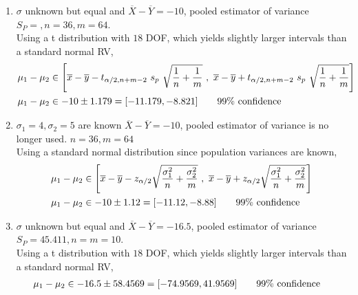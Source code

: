 \begin{enumerate}
	\item  $ \sigma $ unknown but equal and $ \overline{X} - \overline{Y} = -10 $, pooled estimator of variance $ S_P = , n = 36, m = 64$. \\
	Using a t distribution with $ 18 $ DOF, which yields slightly larger intervals than a standard normal RV,\\
	\begin{subequations}
		\begin{align}
			\mu_1 - \mu_2 &\in \left[ \overline{x} - \overline{y} - t_{\alpha / 2, n+m-2}\ s_p\ \sqrt{\frac{1}{n} + \frac{1}{m}}\ ,\ \overline{x} - \overline{y} + t_{\alpha / 2, n+m-2}\ s_p\ \sqrt{\frac{1}{n} + \frac{1}{m}} \right]  \nonumber \\
			\mu_1 - \mu_2 &\in -10 \pm 1.179 = [-11.179, -8.821] \qquad \text{99\% confidence}  
		\end{align}\\
	\end{subequations}
	
	\item  $ \sigma_1 = 4, \sigma_2 = 5 $ are known  $ \overline{X} - \overline{Y} = -10 $, pooled estimator of variance is no longer used. $n = 36, m = 64$ \\
	Using a standard normal distribution since population variances are known,\\
	\begin{subequations}
		\begin{align}
			\mu_1 - \mu_2 &\in \left[ \overline{x} - \overline{y} - z_{\alpha / 2} \sqrt{\frac{\sigma_1^2}{n} + \frac{\sigma_2^2}{m}}\ ,\ \overline{x} - \overline{y} + z_{\alpha / 2} \sqrt{\frac{\sigma_1^2}{n} + \frac{\sigma_2^2}{m}} \right]   \nonumber \\
			\mu_1 - \mu_2 &\in -10 \pm 1.12 = [-11.12, -8.88] \qquad \text{99\% confidence}  
		\end{align}\\
	\end{subequations}


	\item  $ \sigma $ unknown but equal and $ \overline{X} - \overline{Y} = -16.5 $, pooled estimator of variance $ S_P = 45.411, n = m = 10$. \\
	
	Using a t distribution with $ 18 $ DOF, which yields slightly larger intervals than a standard normal RV,\\
	\begin{subequations}
		\begin{align}		
			\mu_1 - \mu_2 &\in -16.5 \pm 58.4569 = [-74.9569, 41.9569] \qquad \text{99\% confidence}
		\end{align}\\
	\end{subequations}


\end{enumerate}

